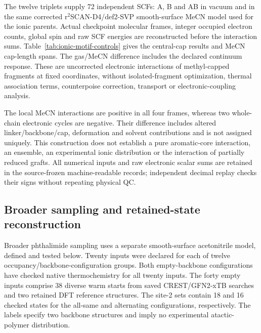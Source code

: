 \documentclass[11pt]{article}
\begin{document}
The twelve triplets supply 72 independent SCFs: A, B and AB in vacuum and in the same corrected r$^2$SCAN-D4/def2-SVP smooth-surface MeCN model used for the ionic parents. Actual checkpoint molecular frames, integer occupied electron counts, global spin and raw SCF energies are reconstructed before the interaction sums. Table~\ref{tab:ionic-motif-controls} gives the central-cap results and MeCN cap-length spans. The gas/MeCN difference includes the declared continuum response. These are uncorrected electronic interactions of methyl-capped fragments at fixed coordinates, without isolated-fragment optimization, thermal association terms, counterpoise correction, transport or electronic-coupling analysis.

\begin{table}[htbp]\centering\small
\caption{Electronic definitions at matched ionic parent frames. All values are kJ/mol. The first column of energies is the whole-chain occupancy cycle with each parent graph at its retained geometry; the next two are the frozen methyl-capped A/B/AB interactions at 1.09 \AA. The cap span is the deterministic 1.07--1.11-\AA\ MeCN variation, not a confidence interval.}
\label{tab:ionic-motif-controls}
\resizebox{\linewidth}{!}{}
\end{table}

The local MeCN interactions are positive in all four frames, whereas two whole-chain electronic cycles are negative. Their difference includes altered linker/backbone/cap, deformation and solvent contributions and is not assigned uniquely. This construction does not establish a pure aromatic-core interaction, an ensemble, an experimental ionic distribution or the interaction of partially reduced grafts. All numerical inputs and raw electronic scalar sums are retained in the source-frozen machine-readable records; independent decimal replay checks their signs without repeating physical QC.

\subsection{Broader sampling and retained-state reconstruction}
Broader phthalimide sampling uses a separate smooth-surface acetonitrile model, defined and tested below. Twenty inputs were declared for each of twelve occupancy/backbone-configuration groups. Both empty-backbone configurations have checked native thermochemistry for all twenty inputs. The forty empty inputs comprise 38 diverse warm starts from saved CREST/GFN2-xTB searches and two retained DFT reference structures.\cite{pracht2020crest} The site-2 sets contain 18 and 16 checked states for the all-same and alternating configurations, respectively. The labels specify two backbone structures and imply no experimental atactic-polymer distribution.
\end{document}
